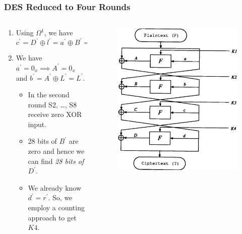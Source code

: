 \documentclass{beamer}
\begin{document}
	\begin{frame}
		\frametitle{DES Reduced to Four Rounds}
		\begin{columns}
			\begin{column}{0.65\textwidth}
				\begin{enumerate}
					\item<2-> Using \(\Omega^1\), we have
					\begin{equation}
						c^\prime = D^\prime \oplus l^\prime = a^\prime \oplus B^\prime \implies D^\prime = B^\prime \oplus l^\prime
						\label{eq:des-4rd-D}
					\end{equation}
					\item<3-> We have \(a^\prime = 0_x \implies A^\prime = 0_x\)
					and \(b^\prime = A^\prime \oplus L^\prime = L^\prime\).
					\begin{itemize}
						\item<4-> In the second round S2, \dots, S8 receive
						zero XOR input.
						\item<5-> 28 bits of \(B^\prime\) are zero and hence we
						can find \emph{28 bits of \(D^\prime\)}.
						\item<6-> We already know \(d^\prime = r^\prime\). So,
						we employ a counting approach to get \(K4\).
					\end{itemize}
				\end{enumerate}
			\end{column}
			\begin{column}{0.35\textwidth}
				\begin{figure}[!ht]
					\centering
					\includegraphics[width=\columnwidth]{images/des_4round.png}

\end{figure}
\end{column}
\end{columns}
\end{frame}
\end{document}
